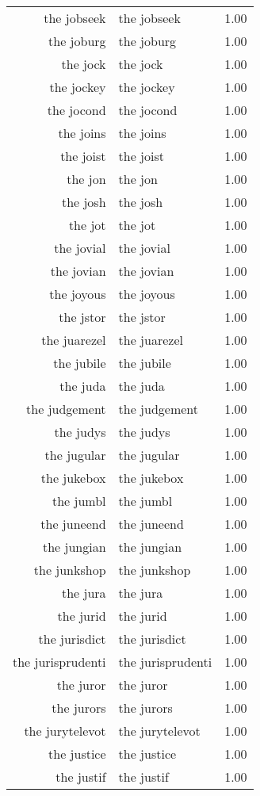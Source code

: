 \begin{table}[ht]
\begin{tabular}{rlr}
  the jobseek & the jobseek & 1.00 \\ 
  the joburg & the joburg & 1.00 \\ 
  the jock & the jock & 1.00 \\ 
  the jockey & the jockey & 1.00 \\ 
  the jocond & the jocond & 1.00 \\ 
  the joins & the joins & 1.00 \\ 
  the joist & the joist & 1.00 \\ 
  the jon & the jon & 1.00 \\ 
  the josh & the josh & 1.00 \\ 
  the jot & the jot & 1.00 \\ 
  the jovial & the jovial & 1.00 \\ 
  the jovian & the jovian & 1.00 \\ 
  the joyous & the joyous & 1.00 \\ 
  the jstor & the jstor & 1.00 \\ 
  the juarezel & the juarezel & 1.00 \\ 
  the jubile & the jubile & 1.00 \\ 
  the juda & the juda & 1.00 \\ 
  the judgement & the judgement & 1.00 \\ 
  the judys & the judys & 1.00 \\ 
  the jugular & the jugular & 1.00 \\ 
  the jukebox & the jukebox & 1.00 \\ 
  the jumbl & the jumbl & 1.00 \\ 
  the juneend & the juneend & 1.00 \\ 
  the jungian & the jungian & 1.00 \\ 
  the junkshop & the junkshop & 1.00 \\ 
  the jura & the jura & 1.00 \\ 
  the jurid & the jurid & 1.00 \\ 
  the jurisdict & the jurisdict & 1.00 \\ 
  the jurisprudenti & the jurisprudenti & 1.00 \\ 
  the juror & the juror & 1.00 \\ 
  the jurors & the jurors & 1.00 \\ 
  the jurytelevot & the jurytelevot & 1.00 \\ 
  the justice & the justice & 1.00 \\ 
  the justif & the justif & 1.00 \\ 

\end{tabular}
\end{table}
